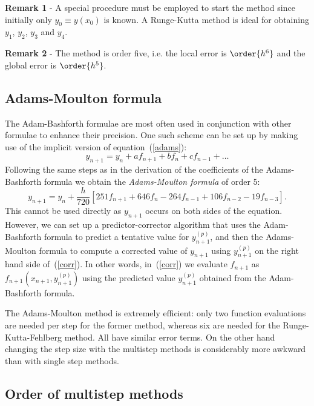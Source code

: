 \smallskip

\noindent \textbf{Remark 1} - A special procedure must be employed to
start the method since initially only $y_0 \equiv y(x_0)$ is known. A
Runge-Kutta method is ideal for obtaining $y_1$, $y_2$, $y_3$ and
$y_4$.

\smallskip

\noindent \textbf{Remark 2} - The method is order five, i.e. the local
error is $\order{h^6}$ and the global error is $\order{h^5}$.

\subsection{Adams-Moulton formula}

The Adam-Bashforth formulae are most often used in conjunction with
other formulae to enhance their precision.  One such scheme can be set
up by making use of the implicit version of equation~(\ref{adams}):
%
\begin{equation}
  y_{n+1} = y_n + a f_{n+1} + b f_n + c f_{n-1} + \ldots
\end{equation}
%
Following the same steps as in the derivation of the coefficients of
the Adams-Bashforth formula we obtain the \textit{Adams-Moulton
  formula} of order 5:
%
\begin{equation}
  y_{n+1} = y_n + \frac{h}{720} [ 251 f_{n+1} + 646 f_n - 264 f_{n-1} +
  106 f_{n-2} - 19 f_{n-3}].
 \label{corr}
\end{equation}
%
This cannot be used directly as $y_{n+1}$ occurs on both sides of the
equation. However, we can set up a predictor-corrector algorithm that
uses the Adam-Bashforth formula to predict a tentative value for
$y^{(p)}_{n+1}$, and then the Adams-Moulton formula to compute a
corrected value of $y_{n+1}$ using $y^{(p)}_{n+1}$ on the right hand
side of~(\ref{corr}).  In other words, in~(\ref{corr}) we evaluate
$f_{n+1}$ as $f_{n+1}(x_{n+1},y^{(p)}_{n+1})$ using the predicted
value $y^{(p)}_{n+1}$ obtained from the Adam-Bashforth formula.

The Adams-Moulton method is extremely efficient: only two function
evaluations are needed per step for the former method, whereas six are
needed for the Runge-Kutta-Fehlberg method.  All have similar error
terms.  On the other hand changing the step size with the multistep
methods is considerably more awkward than with single step methods.

\subsection{Order of multistep methods}

